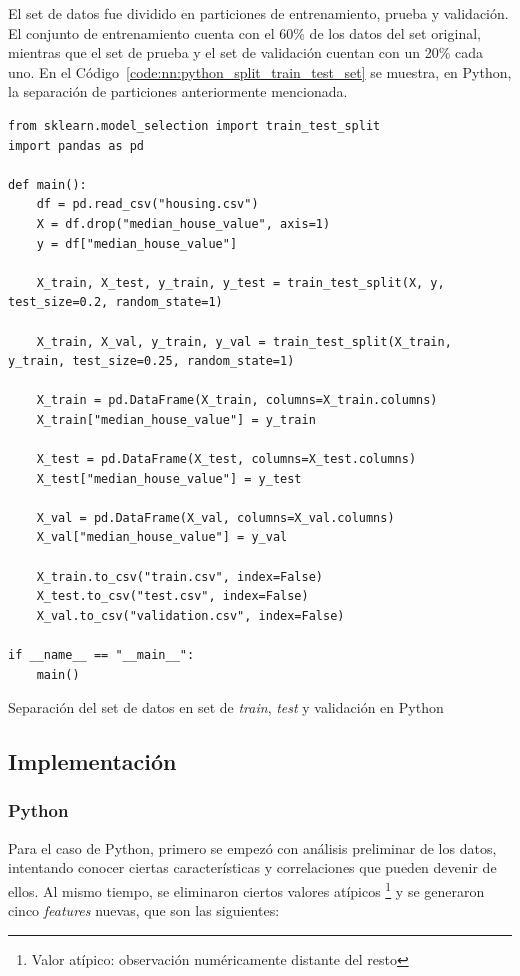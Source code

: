 \documentclass[11pt]{article}
\let\Oldsubsection\subsection
\renewcommand{\subsection}{\FloatBarrier\Oldsubsection}
\let\Oldsubsubsection\subsubsection
\renewcommand{\subsubsection}{\FloatBarrier\Oldsubsubsection}
\newcommand{\english}[1]{\textit{#1}}
\begin{document}
El set de datos fue dividido en particiones de entrenamiento, prueba y validación. El conjunto de entrenamiento cuenta con el 60\% de los datos del set original, mientras que el set de prueba y el set de validación cuentan con un 20\% cada uno. En el Código~\ref{code:nn:python_split_train_test_set} se muestra, en Python, la separación de particiones anteriormente mencionada.

\begin{listing}[h]
\begin{verbatim}
from sklearn.model_selection import train_test_split
import pandas as pd

def main():
    df = pd.read_csv("housing.csv")
    X = df.drop("median_house_value", axis=1)
    y = df["median_house_value"]

    X_train, X_test, y_train, y_test = train_test_split(X, y, test_size=0.2, random_state=1)
    
    X_train, X_val, y_train, y_val = train_test_split(X_train, y_train, test_size=0.25, random_state=1)
    
    X_train = pd.DataFrame(X_train, columns=X_train.columns)
    X_train["median_house_value"] = y_train
    
    X_test = pd.DataFrame(X_test, columns=X_test.columns)
    X_test["median_house_value"] = y_test
    
    X_val = pd.DataFrame(X_val, columns=X_val.columns)
    X_val["median_house_value"] = y_val
    
    X_train.to_csv("train.csv", index=False)
    X_test.to_csv("test.csv", index=False)
    X_val.to_csv("validation.csv", index=False)

if __name__ == "__main__":
    main()
\end{verbatim}
\caption{Separación del set de datos en set de \english{train}, \english{test} y validación en Python}
\label{code:nn:python_split_train_test_set}
\end{listing}


\subsection{Implementación}

\subsubsection{Python}

Para el caso de Python, primero se empezó con análisis preliminar de los datos, intentando conocer ciertas características y correlaciones que pueden devenir de ellos. Al mismo tiempo, se eliminaron ciertos valores atípicos \footnote{Valor atípico: observación numéricamente distante del resto} y se generaron cinco \english{features} nuevas, que son las siguientes:
\end{document}
